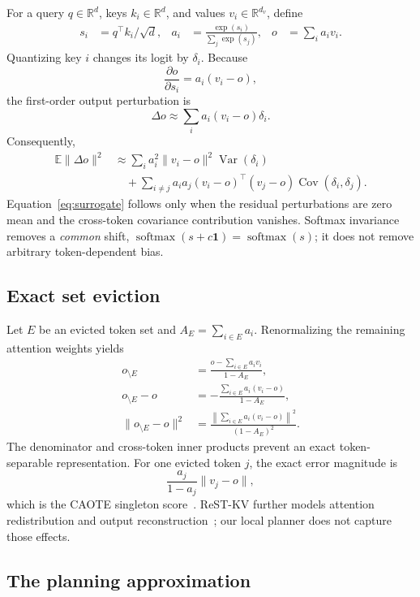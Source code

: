 For a query $q\in\mathbb R^d$, keys $k_i\in\mathbb R^d$, and values
$v_i\in\mathbb R^{d_v}$, define
\begin{align}
 s_i &= q^\top k_i/\sqrt d, &
 a_i &= \frac{\exp(s_i)}{\sum_j\exp(s_j)}, &
 o &= \sum_i a_i v_i .
\end{align}
Quantizing key $i$ changes its logit by $\delta_i$.  Because
\[
 \frac{\partial o}{\partial s_i}=a_i(v_i-o),
\]
the first-order output perturbation is
\begin{equation}
 \Delta o \approx \sum_i a_i(v_i-o)\delta_i .
 \label{eq:app-linear}
\end{equation}
Consequently,
\begin{align}
 \mathbb E\|\Delta o\|^2
 &\approx
 \sum_i a_i^2\|v_i-o\|^2\operatorname{Var}(\delta_i)
 \nonumber\\
 &\quad+
 \sum_{i\ne j}a_i a_j
 (v_i-o)^\top(v_j-o)\operatorname{Cov}(\delta_i,\delta_j).
 \label{eq:app-covariance}
\end{align}
Equation~\eqref{eq:surrogate} follows only when the residual perturbations are
zero mean and the cross-token covariance contribution vanishes.  Softmax
invariance removes a \emph{common} shift,
$\operatorname{softmax}(s+c\mathbf 1)=\operatorname{softmax}(s)$; it does not
remove arbitrary token-dependent bias.

\subsection{Exact set eviction}

Let $E$ be an evicted token set and $A_E=\sum_{i\in E}a_i$.  Renormalizing the
remaining attention weights yields
\begin{align}
 o_{\setminus E}
 &=\frac{o-\sum_{i\in E}a_i v_i}{1-A_E},\\
 o_{\setminus E}-o
 &=-\frac{\sum_{i\in E}a_i(v_i-o)}{1-A_E},\\
 \|o_{\setminus E}-o\|^2
 &=\frac{\left\|\sum_{i\in E}a_i(v_i-o)\right\|^2}
 {(1-A_E)^2}.
 \label{eq:app-exact-eviction}
\end{align}
The denominator and cross-token inner products prevent an exact token-separable
representation.  For one evicted token $j$, the exact error magnitude is
\[
 \frac{a_j}{1-a_j}\|v_j-o\|,
\]
which is the CAOTE singleton score~\citep{goel2025caote}.  ReST-KV further models
attention redistribution and output reconstruction~\citep{an2026restkv}; our
local planner does not capture those effects.

\subsection{The planning approximation}

